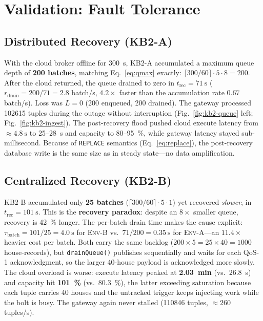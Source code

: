 \documentclass[conference]{IEEEtran}
\newcommand{\code}[1]{\texttt{#1}}
\begin{document}
\section{Validation: Fault Tolerance}\label{sec:kb2}
\subsection{Distributed Recovery (KB2-A)}
With the cloud broker offline for \SI{300}{\second}, KB2-A accumulated a maximum
queue depth of \textbf{200 batches}, matching Eq.~\eqref{eq:qmax} exactly:
$\lceil 300/60\rceil \cdot 5 \cdot 8 = 200$. After the cloud returned, the queue
drained to zero in $t_{\text{rec}}=\SI{71}{\second}$
($r_{\text{drain}}=200/71=2.8$ batch/s, $4.2\times$ faster than the
accumulation rate $0.67$ batch/s). Loss was $L=0$ (200 enqueued, 200 drained).
The gateway processed \num{102615} tuples during the outage without interruption
(Fig.~\ref{fig:kb2-queue} left; Fig.~\ref{fig:kb2-ingest}). The post-recovery
flood pushed cloud execute latency from $\approx\!\SI{4.8}{\second}$ to
\SI{25}{}--\SI{28}{\second} and capacity to \SI{80}{}--\SI{95}{\percent}, while
gateway latency stayed sub-millisecond. Because of \code{REPLACE} semantics
(Eq.~\eqref{eq:replace}), the post-recovery database write is the same size as in
steady state---no data amplification.

\subsection{Centralized Recovery (KB2-B)}
KB2-B accumulated only \textbf{25 batches}
($\lceil 300/60\rceil \cdot 5 \cdot 1$) yet recovered \emph{slower}, in
$t_{\text{rec}}=\SI{101}{\second}$. This is the \textbf{recovery paradox}: despite
an $8\times$ smaller queue, recovery is \SI{42}{\percent} longer. The per-batch
drain time makes the cause explicit: $\tau_{\text{batch}}=101/25=\SI{4.0}{\second}$
for \textsc{Env-B} vs.\ $71/200=\SI{0.35}{\second}$ for \textsc{Env-A}---an
$11.4\times$ heavier cost per batch. Both carry the same backlog
($200\times 5 = 25\times 40 = 1000$ house-records), but \code{drainQueue()}
publishes sequentially and waits for each QoS-1 acknowledgment, so the larger
40-house payload is acknowledged more slowly. The cloud overload is worse: execute
latency peaked at \textbf{\SI{2.03}{\minute}} (vs.\ \SI{26.8}{\second}) and
capacity hit \textbf{\SI{101}{\percent}} (vs.\ \SI{80.3}{\percent}), the latter
exceeding saturation because each tuple carries 40 houses and the untracked
trigger keeps injecting work while the bolt is busy. The gateway again never
stalled (\num{110846} tuples, $\approx\!260$ tuples/s).
\end{document}

